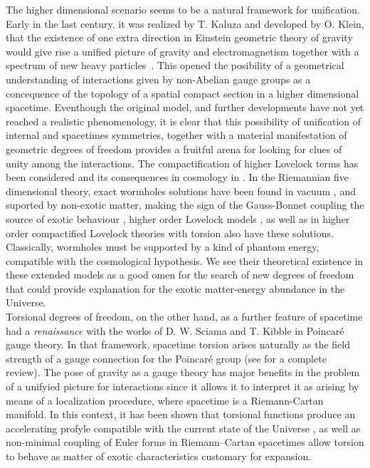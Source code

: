\documentclass[aps,prd,12pt,superscriptaddress,showpacs,showkeys,longbibliography,reprint]{revtex4-1}
\begin{document}
The higher dimensional scenario seems to be a natural framework for unification. Early in the last century, it was realized by T. Kaluza and developed by O. Klein, that the existence of one extra direction in Einstein geometric theory of gravity would give rise a unified picture of gravity and electromagnetism together with a spectrum of new heavy particles~\cite{Kaluza:1921tu,*Klein:1926tv}. This opened the posibility of a geometrical understanding of interactions given by non-Abelian gauge groups as a concequence of the topology of a spatial compact section in a higher dimensional spacetime. Eventhough the original model, and further developments have not yet reached a realistic phenomenology, it is clear that this possibility of unification of internal and spacetimes symmetries, together with a material manifestation of geometric degrees of freedom provides a fruitful arena for looking for clues of unity among the interactions. The compactification of higher Lovelock terms has been considered \cite{MuellerHoissen:1985mm,MuellerHoissen:1989yv} and its consequences in cosmology in \cite{MuellerHoissen:1985ij,Deruelle:1986iv,Deruelle:1989fj}. In the Riemannian five dimensional theory, exact wormholes solutions have been found in vacuum \cite{Dotti:2006cp,Dotti:2007az}, and suported by non-exotic matter, making the sign of the Gauss-Bonnet coupling the source of exotic behaviour \cite{Mehdizadeh:2015jra}, higher order Lovelock models \cite{Mehdizadeh:2015dta}, as well as in higher order compactified Lovelock theories with torsion \cite{Canfora:2008ka} also have these solutions. Classically, wormholes must be supported by a kind of phantom energy, compatible with the cosmological hypothesis. We see their theoretical existence in these extended models as a good omen for the search of new degrees of freedom that could provide explanation for the exotic matter-energy abundance in the Universe. \\
Torsional degrees of freedom, on the other hand, as a further feature of spacetime had a \textit{renaissance} with the works of D. W. Sciama and T. Kibble \cite{Kibble:1961ba} in Poincar\'e gauge theory. In that framework, spacetime torsion arises naturally as the field strength of a gauge connection for the Poincar\'e group (see \cite{Hehl:1976kj,Blagojevic:2002du} for a complete review). The pose of gravity as a gauge theory has major benefits in the problem of a unifyied picture for interactions since it allows it to interpret it as arising by means of a localization procedure, where spacetime is a Riemann-Cartan manifold. In this context, it has been shown that torsional functions produce an accelerating profyle compatible with the current state of the Universe \cite{Shie:2008ms}, as well as non-minimal coupling of Euler forms in Riemann--Cartan spacetimes allow torsion to behave as matter of exotic characteristics \cite{Toloza:2013wi} customary for expansion.
\end{document}
